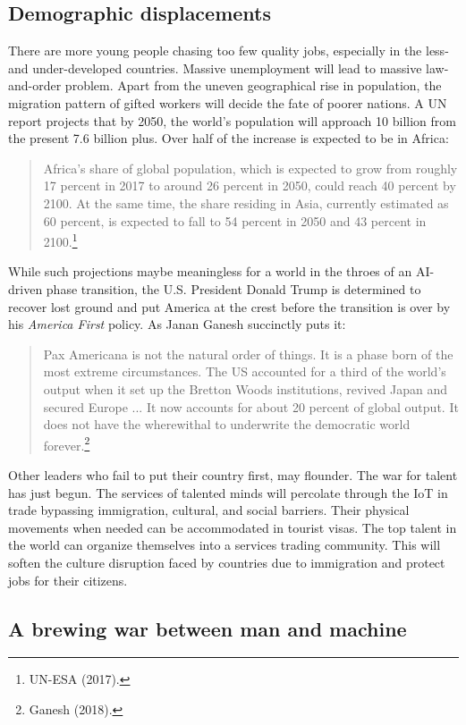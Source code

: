 \begin{multicols}{2}
\subsection*{Demographic displacements}

There are more young people chasing too few quality jobs, especially in the less- and under-developed countries. Massive unemployment will lead to massive law-and-order problem. Apart from the uneven geographical rise in population, the migration pattern of gifted workers will decide the fate of poorer nations. A UN report projects that by 2050, the world's population will approach 10 billion from the present 7.6 billion plus. Over half of the increase is expected to be in Africa:
\begin{quote}
Africa's share of global population, which is expected to grow from roughly 17 percent in 2017 to around 26 percent in 2050, could reach 40 percent by 2100. At the same time, the share residing in Asia, currently estimated as 60 percent, is expected to fall to 54 percent in 2050 and 43 percent in 2100.\footnote{UN-ESA (2017).}
\end{quote}

While such projections maybe meaningless for a world in the throes of an AI-driven phase transition, the U.S. President Donald Trump is determined to recover lost ground and put America at the crest before the transition is over by his \textit{America First} policy. As Janan Ganesh succinctly puts it:
\begin{quote}
Pax Americana is not the natural order of things. It is a phase born of the most extreme
circumstances. The US accounted for a third of the world's output when it set up the Bretton Woods institutions, revived Japan and secured Europe ... It now accounts for about 20 percent of global output. It does not have the wherewithal to underwrite the democratic world forever.\footnote{Ganesh (2018).}
\end{quote}

Other leaders who fail to put their country first, may flounder. The war for talent has just begun. The services of talented minds will percolate through the IoT in trade bypassing immigration, cultural, and social barriers. Their physical movements when needed can be accommodated in tourist visas. The top talent in the world can organize themselves into a services trading community. This will soften the culture disruption faced by countries due to immigration and protect jobs for their citizens.

\subsection*{A brewing war between man and machine}


\end{multicols}
